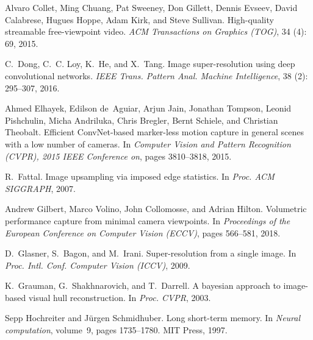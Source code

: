 \documentclass{bmvc2k}
\begin{document}
\begin{thebibliography}{47}
Alvaro Collet, Ming Chuang, Pat Sweeney, Don Gillett, Dennis Evseev, David
  Calabrese, Hugues Hoppe, Adam Kirk, and Steve Sullivan.
\newblock High-quality streamable free-viewpoint video.
\newblock \emph{ACM Transactions on Graphics (TOG)}, 34 (4):
  69, 2015.

C.~Dong, C.~C. Loy, K.~He, and X.~Tang.
\newblock Image super-resolution using deep convolutional networks.
\newblock \emph{IEEE Trans. Pattern Anal. Machine Intelligence}, 38
  (2): 295--307, 2016.

Ahmed Elhayek, Edilson de~Aguiar, Arjun Jain, Jonathan Tompson, Leonid
  Pishchulin, Micha Andriluka, Chris Bregler, Bernt Schiele, and Christian
  Theobalt.
\newblock Efficient {ConvNet}-based marker-less motion capture in general
  scenes with a low number of cameras.
\newblock In \emph{Computer {Vision} and {Pattern} {Recognition} ({CVPR}), 2015
  {IEEE} {Conference} on}, pages 3810--3818, 2015.

R.~Fattal.
\newblock Image upsampling via imposed edge statistics.
\newblock In \emph{Proc. ACM SIGGRAPH}, 2007.

Andrew Gilbert, Marco Volino, John Collomosse, and Adrian Hilton.
\newblock Volumetric performance capture from minimal camera viewpoints.
\newblock In \emph{Proceedings of the European Conference on Computer Vision
  (ECCV)}, pages 566--581, 2018.

D.~Glasner, S.~Bagon, and M.~Irani.
\newblock Super-resolution from a single image.
\newblock In \emph{Proc. Intl. Conf. Computer Vision (ICCV)}, 2009.

K.~Grauman, G.~Shakhnarovich, and T.~Darrell.
\newblock A bayesian approach to image-based visual hull reconstruction.
\newblock In \emph{Proc. CVPR}, 2003.

Sepp Hochreiter and J{\"u}rgen Schmidhuber.
\newblock Long short-term memory.
\newblock In \emph{Neural computation}, volume~9, pages 1735--1780. MIT Press,
  1997.


\end{thebibliography}
\end{document}
